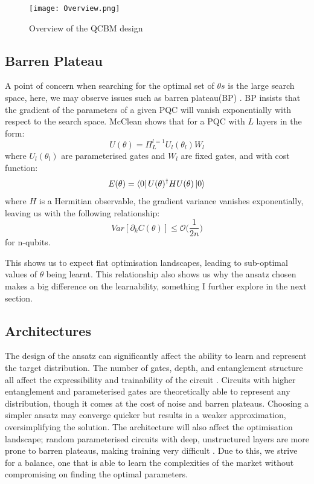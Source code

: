 \documentclass[12pt]{article}
\newcommand{\newp}
    {
    \vskip 0.5cm 
  }
\numberwithin{equation}{section}
\begin{document}
\begin{figure}[h!]
  \centering 
  \texttt{[image: Overview.png]}
  \caption{Overview of the QCBM design}
  \label{fig:overview}
\end{figure}

\newpage
\subsection{Barren Plateau}
A point of concern when searching for the optimal set of $\theta s$ is the large 
search space, here, we may observe issues such as barren plateau(BP) \autocite{ragone_2024_a}. BP 
insists that the gradient of the parameters of a given PQC will vanish exponentially 
with respect to the search space. McClean \autocite{mcclean_2018_barren} shows that for a PQC with $L$ layers in the form: 
\begin{equation}
  U(\theta) = \Pi_L^{l=1}U_l(\theta_l)W_l
\end{equation}
where $U_l(\theta_l)$ are parameterised gates and $W_l$ are fixed gates, and with 
cost function:
\begin{equation}
E(\theta) = \bra{0}U(\theta)^\dagger HU(\theta)\ket{0}
\end{equation}
where $H$ is a Hermitian observable, the gradient variance vanishes exponentially,
leaving us with the following relationship:
\begin{equation}
  Var[\partial_kC(\theta)] \leq \mathcal{O}\bigl(\frac{1}{2n}\bigr)
\end{equation}
for n-qubits. 
\newp 
This shows us to expect flat optimisation landscapes\autocite{cerezo_2021_cost}, leading to sub-optimal values
of $\theta$ being learnt. This relationship also shows us why the ansatz chosen 
makes a big difference on the learnability, something I further explore in the 
next section. 
\subsection{Architectures}
The design of the ansatz can significantly affect the ability to learn and represent 
the target distribution. The number of gates, depth, and entanglement structure
all affect the expressibility and trainability of the circuit \autocite{rudolph_2024_trainability,wilson_2021_empirical}. Circuits with 
higher entanglement and parameterised gates are theoretically able to represent 
any distribution, though it comes at the cost of noise and barren plateaus. 
Choosing a simpler ansatz may converge quicker but results in a weaker approximation,
oversimplifying the solution.
The architecture will also affect the optimisation landscape; random parameterised 
circuits with deep, unstructured layers are more prone to barren plateaus, making 
training very difficult \autocite{cerezo_2021_cost}. Due to this, we strive for a balance, one that is 
able to learn the complexities of the market without compromising on finding the 
optimal parameters.
\end{document}

